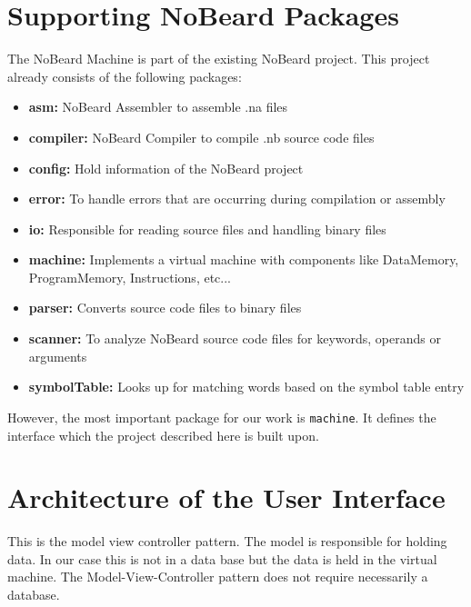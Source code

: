 \section{Supporting NoBeard Packages}
The NoBeard Machine is part of the existing NoBeard project. This project already consists of the following packages:
\begin{itemize}
\item \textbf{asm: }NoBeard Assembler to assemble .na files 
\item \textbf{compiler: }NoBeard Compiler to compile .nb source code files
\item \textbf{config: }Hold information of the NoBeard project
\item \textbf{error: }To handle errors that are occurring during compilation or assembly   
\item \textbf{io: }Responsible for reading source files and handling binary files 
\item \textbf{machine: }Implements a virtual machine with components like DataMemory, ProgramMemory, Instructions, etc...  
\item \textbf{parser: }Converts source code files to binary files 
\item \textbf{scanner: }To analyze NoBeard source code files for keywords, operands or arguments  
\item \textbf{symbolTable: }Looks up for matching words based on the symbol table entry  
\end{itemize}
However, the most important package for our work is \lstinline$machine$. It defines the interface which the project described here is built upon.
\section{Architecture of the User Interface}
This is the model view controller pattern. The model is responsible for holding data. In our case this is not in a data base but the data is held in the virtual machine. The Model-View-Controller pattern does not require necessarily a database.

